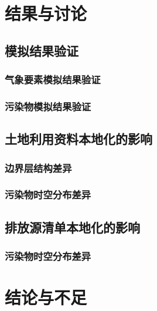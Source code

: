 \documentclass[a4paper]{article}
\begin{document}
\section{结果与讨论}
\subsection{模拟结果验证}
\subsubsection{气象要素模拟结果验证}
\subsubsection{污染物模拟结果验证}
\subsection{土地利用资料本地化的影响}
\subsubsection{边界层结构差异}
\subsubsection{污染物时空分布差异}
\subsection{排放源清单本地化的影响}
\subsubsection{污染物时空分布差异}
\section{结论与不足}
\end{document}
